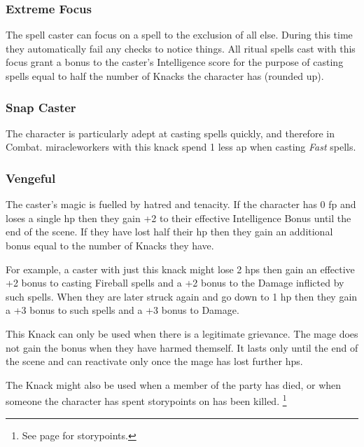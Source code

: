 \begin{multicols}{2}

\subsubsection{Extreme Focus}

The spell caster can focus on a spell to the exclusion of all else.
During this time they automatically fail any checks to notice things.
All ritual spells cast with this focus grant a bonus to the caster's Intelligence score for the purpose of casting spells equal to half the number of Knacks the character has (rounded up).

\subsubsection{Snap Caster}

The character is particularly adept at casting spells quickly, and therefore in Combat.
\Glspl{miracleworker} with this knack spend 1 less \gls{ap} when casting \textit{Fast} spells.

\subsubsection{Vengeful}

The caster's magic is fuelled by hatred and tenacity.
If the character has 0 \gls{fp} and loses a single \gls{hp} then they gain +2 to their effective Intelligence Bonus until the end of the scene.
If they have lost half their \gls{hp} then they gain an additional bonus equal to the number of Knacks they have.

For example, a caster with just this knack might lose 2 \glspl{hp} then gain an effective +2 bonus to casting Fireball spells and a +2 bonus to the Damage inflicted by such spells.
When they are later struck again and go down to 1 \gls{hp} then they gain a +3 bonus to such spells and a +3 bonus to Damage.

This Knack can only be used when there is a legitimate grievance.
The mage does not gain the bonus when they have harmed themself.
It lasts only until the end of the scene and can reactivate only once the mage has lost further \glspl{hp}.

The Knack might also be used when a member of the party has died, or when someone the character has spent \glspl{storypoint} on has been killed.%
\footnote{See page \pageref{stories} for \glspl{storypoint}.}


\end{multicols}

